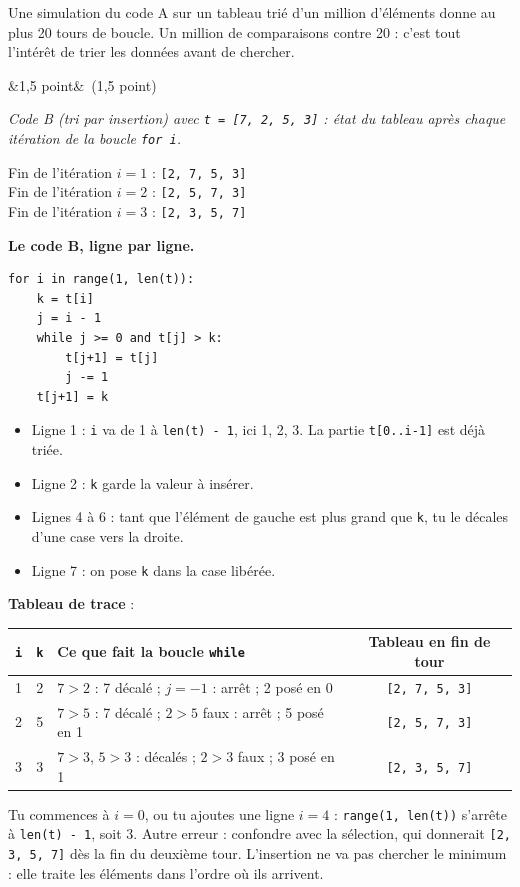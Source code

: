 \documentclass[11pt, a4paper]{exam}
\newcommand{\code}[1]{\texttt{#1}}
\newcommand{\Q}[3]{\par\needspace{5\baselineskip}\bigskip\noindent{\large\bfseries Question #1}\ifx&#2&\else\ \textnormal{(#2)}\fi\par\nopagebreak\smallskip\noindent\textit{#3}\par\nopagebreak\smallskip}
\begin{document}
Une simulation du code A sur un tableau trié d'un million d'éléments donne au plus 20 tours de boucle. Un million de comparaisons contre 20 : c'est tout l'intérêt de trier les données avant de chercher.

\Q{6 (a)}{1,5 point}{Code B (tri par insertion) avec \code{t = [7, 2, 5, 3]} : état du tableau après chaque itération de la boucle \code{for i}.}
\begin{reponse}
Fin de l'itération $i = 1$ : \code{[2, 7, 5, 3]} \\
Fin de l'itération $i = 2$ : \code{[2, 5, 7, 3]} \\
Fin de l'itération $i = 3$ : \code{[2, 3, 5, 7]}
\end{reponse}
\textbf{Le code B, ligne par ligne.}
\begin{lstlisting}
for i in range(1, len(t)):
    k = t[i]
    j = i - 1
    while j >= 0 and t[j] > k:
        t[j+1] = t[j]
        j -= 1
    t[j+1] = k
\end{lstlisting}
\begin{itemize}
\item Ligne 1 : \code{i} va de 1 à \code{len(t) - 1}, ici 1, 2, 3. La partie \code{t[0..i-1]} est déjà triée.
\item Ligne 2 : \code{k} garde la valeur à insérer.
\item Lignes 4 à 6 : tant que l'élément de gauche est plus grand que \code{k}, tu le décales d'une case vers la droite.
\item Ligne 7 : on pose \code{k} dans la case libérée.
\end{itemize}
\textbf{Tableau de trace} :
\begin{center}
\renewcommand{\arraystretch}{1.2}
\begin{tabular}{|c|c|l|c|}
\hline
\code{i} & \code{k} & \textbf{Ce que fait la boucle \code{while}} & \textbf{Tableau en fin de tour} \\ \hline
1 & 2 & $7 > 2$ : 7 décalé ; $j = -1$ : arrêt ; 2 posé en 0 & \code{[2, 7, 5, 3]} \\
2 & 5 & $7 > 5$ : 7 décalé ; $2 > 5$ faux : arrêt ; 5 posé en 1 & \code{[2, 5, 7, 3]} \\
3 & 3 & $7 > 3$, $5 > 3$ : décalés ; $2 > 3$ faux ; 3 posé en 1 & \code{[2, 3, 5, 7]} \\ \hline
\end{tabular}
\end{center}
\begin{erreur}
Tu commences à $i = 0$, ou tu ajoutes une ligne $i = 4$ : \code{range(1, len(t))} s'arrête à \code{len(t) - 1}, soit 3. Autre erreur : confondre avec la sélection, qui donnerait \code{[2, 3, 5, 7]} dès la fin du deuxième tour. L'insertion ne va pas chercher le minimum : elle traite les éléments dans l'ordre où ils arrivent.
\end{erreur}
\end{document}
